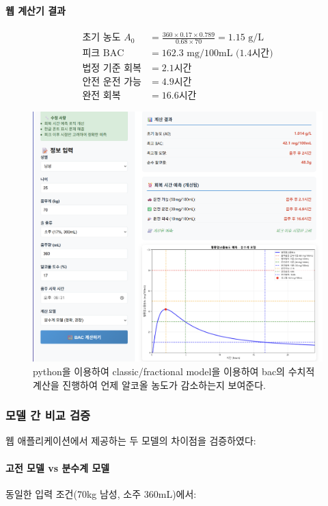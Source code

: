 \documentclass[11pt]{article}
\begin{document}
\paragraph{웹 계산기 결과}
\begin{align}
\text{초기 농도 } A_0 &= \frac{360 \times 0.17 \times 0.789}{0.68 \times 70} = 1.15 \text{ g/L} \\
\text{피크 BAC} &= 162.3 \text{ mg/100mL (1.4시간)} \\
\text{법정 기준 회복} &= 2.1 \text{시간} \\
\text{안전 운전 가능} &= 4.9 \text{시간} \\
\text{완전 회복} &= 16.6 \text{시간}
\end{align}

\begin{figure}[H]
    \centering
    \includegraphics[width=\textwidth]{Web_calculator.png}
    \caption{python을 이용하여 classic/fractional model을 이용하여 bac의 수치적 계산을 진행하여 언제 알코올 농도가 감소하는지 보여준다. }
    \label{fig:web_calculator}
\end{figure}

\subsubsection{모델 간 비교 검증}

웹 애플리케이션에서 제공하는 두 모델의 차이점을 검증하였다:

\paragraph{고전 모델 vs 분수계 모델}
동일한 입력 조건(70kg 남성, 소주 360mL)에서:
\end{document}
